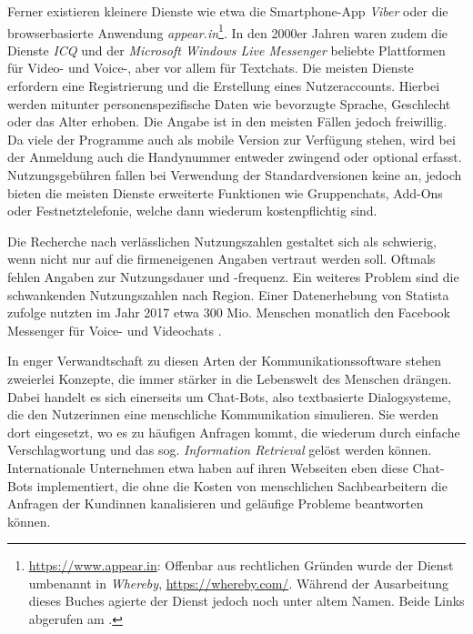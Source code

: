 Ferner existieren kleinere Dienste wie etwa die Smartphone-App \emph{Viber} oder die browserbasierte Anwendung \emph{appear.in}\footnote{\url{https://www.appear.in}: Offenbar aus rechtlichen Gründen wurde der Dienst umbenannt in \emph{Whereby}, \url{https://whereby.com/}. Während der Ausarbeitung dieses Buches agierte der Dienst jedoch noch unter altem Namen. Beide Links abgerufen am \datum{}.}. In den 2000er Jahren waren zudem die Dienste \emph{ICQ} und der \emph{Microsoft Windows Live Messenger} beliebte Plattformen für Video- und Voice-, aber vor allem für Textchats. Die meisten Dienste erfordern eine Registrierung und die Erstellung eines Nutzeraccounts. Hierbei werden mitunter personenspezifische Daten wie bevorzugte Sprache, Geschlecht oder das Alter erhoben. Die Angabe ist in den meisten Fällen jedoch freiwillig. Da viele der Programme auch als mobile Version zur Verfügung stehen, wird bei der Anmeldung auch die Handynummer entweder zwingend oder optional erfasst. Nutzungsgebühren fallen bei Verwendung der Standardversionen keine an, jedoch bieten die meisten Dienste erweiterte Funktionen wie Gruppenchats, Add-Ons oder Festnetztelefonie, welche dann wiederum kostenpflichtig sind.

Die Recherche nach verlässlichen Nutzungszahlen gestaltet sich als schwierig, wenn nicht nur auf die firmeneigenen Angaben vertraut werden soll. Oftmals fehlen Angaben zur Nutzungsdauer und -frequenz. Ein weiteres Problem sind die schwankenden Nutzungszahlen nach Region. Einer Datenerhebung von Statista zufolge nutzten im Jahr 2017 etwa 300 Mio. Menschen monatlich den Facebook Messenger für Voice- und Videochats \citep[]{statista_facebook_2017}.

In enger Verwandtschaft zu diesen Arten der Kommunikationssoftware stehen zweierlei Konzepte, die immer stärker in die Lebenswelt des Menschen drängen. Dabei handelt es sich einerseits um Chat-Bots, also textbasierte Dialogsysteme, die den Nutzer{\textperiodcentered}innen eine menschliche Kommunikation simulieren. Sie werden dort eingesetzt, wo es zu häufigen Anfragen kommt, die wiederum durch einfache Verschlagwortung und das sog. \emph{Information Retrieval} gelöst werden können. Internationale Unternehmen etwa haben auf ihren Webseiten eben diese Chat-Bots implementiert, die ohne die Kosten von menschlichen Sachbearbeitern die Anfragen der Kund{\textperiodcentered}innen kanalisieren und geläufige Probleme beantworten können.

